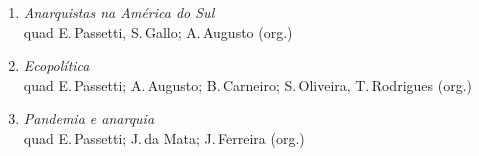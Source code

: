 \medskip
{}

\begin{enumerate}
\setlength\parskip{4.2pt}
\setlength\itemsep{-1.4mm}
\item \textit{Anarquistas na América do Sul}\\quad E.\,Passetti, S.\,Gallo; A.\,Augusto  (org.)
\item \textit{Ecopolítica}\\quad E.\,Passetti; A.\,Augusto; B.\,Carneiro; S.\,Oliveira, T.\,Rodrigues  (org.)
\item \textit{Pandemia e anarquia}\\quad E.\,Passetti; J.\,da Mata; J.\,Ferreira  (org.)
\end{enumerate}



